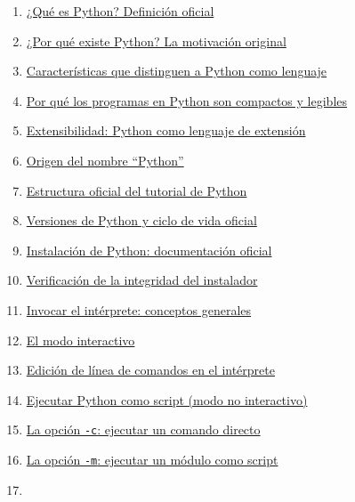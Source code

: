 \documentclass[
  doc,
  floatsintext,
  longtable,
  a4paper,
  nolmodern,
  notxfonts,
  notimes,
  12pt,
  colorlinks=true,linkcolor=blue,citecolor=blue,urlcolor=blue]{apa7}
\providecommand{\tightlist}{%
  \setlength{\itemsep}{0pt}\setlength{\parskip}{0pt}}
\begin{document}
\begin{enumerate}
\def\labelenumi{\arabic{enumi}.}
\tightlist
\item
  \hyperref[1-quuxe9-es-python-definiciuxf3n-oficial]{¿Qué es Python?
  Definición oficial}
\item
  \hyperref[2-por-quuxe9-existe-python-la-motivaciuxf3n-original]{¿Por
  qué existe Python? La motivación original}
\item
  \hyperref[3-caracteruxedsticas-que-distinguen-a-python-como-lenguaje]{Características
  que distinguen a Python como lenguaje}
\item
  \hyperref[4-por-quuxe9-los-programas-en-python-son-compactos-y-legibles]{Por
  qué los programas en Python son compactos y legibles}
\item
  \hyperref[5-extensibilidad-python-como-lenguaje-de-extensiuxf3n]{Extensibilidad:
  Python como lenguaje de extensión}
\item
  \hyperref[6-origen-del-nombre-python]{Origen del nombre ``Python''}
\item
  \hyperref[7-estructura-oficial-del-tutorial-de-python]{Estructura
  oficial del tutorial de Python}
\item
  \hyperref[8-versiones-de-python-y-ciclo-de-vida-oficial]{Versiones de
  Python y ciclo de vida oficial}
\item
  \hyperref[9-instalaciuxf3n-de-python-documentaciuxf3n-oficial]{Instalación
  de Python: documentación oficial}
\item
  \hyperref[10-verificaciuxf3n-de-la-integridad-del-instalador]{Verificación
  de la integridad del instalador}
\item
  \hyperref[11-invocar-el-intuxe9rprete-conceptos-generales]{Invocar el
  intérprete: conceptos generales}
\item
  \hyperref[12-el-modo-interactivo]{El modo interactivo}
\item
  \hyperref[13-ediciuxf3n-de-luxednea-de-comandos-en-el-intuxe9rprete]{Edición
  de línea de comandos en el intérprete}
\item
  \hyperref[14-ejecutar-python-como-script-modo-no-interactivo]{Ejecutar
  Python como script (modo no interactivo)}
\item
  \hyperref[15-la-opciuxf3n--c-ejecutar-un-comando-directo]{La opción
  \texttt{-c}: ejecutar un comando directo}
\item
  \hyperref[16-la-opciuxf3n--m-ejecutar-un-muxf3dulo-como-script]{La
  opción \texttt{-m}: ejecutar un módulo como script}
\item

\end{enumerate}
\end{document}
